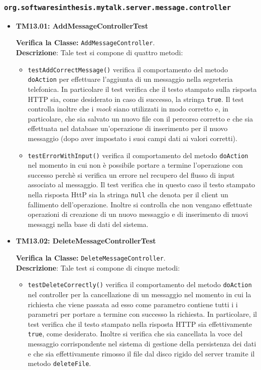 \subsubsection{\texttt{org.softwaresinthesis.mytalk.server.message.controller}}
\begin{itemize}

\item \textbf{TM13.01: AddMessageControllerTest} 

\textbf{Verifica la Classe:} \texttt{AddMessageController}.\\
\textbf{Descrizione}: %
Tale test si compone di quattro metodi: %
\begin{itemize}
\item \texttt{testAddCorrectMessage()} verifica il comportamento del metodo \texttt{doAction} per effettuare l'aggiunta di un messaggio nella segreteria telefonica. In particolare il test verifica che il testo stampato sulla risposta HTTP sia, come desiderato in caso di successo, la stringa \texttt{true}. Il test controlla inoltre che i \textit{mock} siano utilizzati in modo corretto e, in particolare, che sia salvato un nuovo file con il percorso corretto e che sia effettuata nel database un'operazione di inserimento per il nuovo messaggio (dopo aver impostato i suoi campi dati ai valori corretti).

\item \texttt{testErrorWithInput()} verifica il comportamento del metodo \texttt{doAction} nel momento in cui non è possibile portare a termine l'operazione con successo perchè si verifica un errore nel recupero del flusso di input associato al messaggio. Il test verifica che in questo caso il testo stampato nella risposta HttP sia la stringa \texttt{null} che denota per il client un fallimento dell'operazione. Inoltre si controlla che non vengano effettuate operazioni di creazione di un nuovo messaggio e di inserimento di nuovi messaggi nella base di dati del sistema.

\end{itemize}


\item \textbf{TM13.02: DeleteMessageControllerTest} 

\textbf{Verifica la Classe:} \texttt{DeleteMessageController}.\\
\textbf{Descrizione}: %
Tale test si compone di cinque metodi:
\begin{itemize}
\item \texttt{testDeleteCorrectly()} verifica il comportamento del metodo \texttt{doAction} nel controller per la cancellazione di un messaggio nel momento in cui la richiesta che viene passata ad esso come parametro contiene tutti i i parametri per portare a termine con successo la richiesta. In particolare, il test verifica che il testo stampato nella risposta HTTP sia effettivamente \texttt{true}, come desiderato. Inoltre si verifica che sia cancellata la voce del messaggio corrispondente nel sistema di gestione della persistenza dei dati e che sia effettivamente rimosso il file dal disco rigido del server tramite il metodo \texttt{deleteFile}.


\end{itemize}
\end{itemize}
